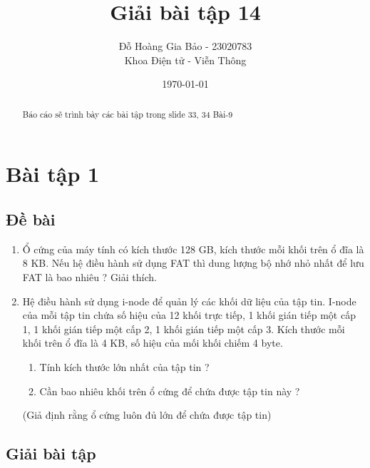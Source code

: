 \documentclass[12pt, letterpaper]{article}
\title{Giải bài tập 14}
\author{Đỗ Hoàng Gia Bảo - 23020783 \\ \small Khoa Điện tử - Viễn Thông}
\date{\today}
\begin{document}
\maketitle

\begin{abstract}
\begin{center}
    Báo cáo sẽ trình bày các bài tập trong slide 33, 34 Bài-9 
\end{center}
\end{abstract}
\newpage
\tableofcontents

\newpage
{}
\setcounter{page}{3} %

\section{Bài tập 1}
\subsection{Đề bài}
\begin{enumerate}[label=\alph*)]
    \item Ổ cứng của máy tính có kích thước 128 GB, kích thước
            mỗi khối trên ổ đĩa là 8 KB. Nếu hệ điều hành sử dụng
            FAT thì dung lượng bộ nhớ nhỏ nhất để lưu FAT là bao
            nhiêu ? Giải thích.
    \item Hệ điều hành sử dụng i-node để quản lý các khối dữ liệu
            của tập tin. I-node của mỗi tập tin chứa số hiệu của 12
            khối trực tiếp, 1 khối gián tiếp một cấp 1, 1 khối gián tiếp
            một cấp 2, 1 khối gián tiếp một cấp 3. Kích thước mỗi
            khối trên ổ đĩa là 4 KB, số hiệu của mối khối chiếm 4
            byte.
            \begin{enumerate}[label=\roman*)]
                \item Tính kích thước lớn nhất của tập tin ?
                \item Cần bao nhiêu khối trên ổ cứng để chứa được tập 
                        tin này ?
            \end{enumerate}
            (Giả định rằng ổ cứng luôn đủ lớn để chứa được tập tin)
\end{enumerate}
\subsection{Giải bài tập}
\end{document}
